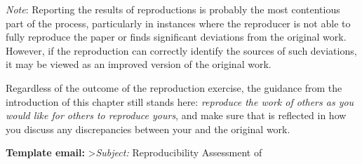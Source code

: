 \documentclass[]{book}
\begin{document}
\emph{Note}: Reporting the results of reproductions is probably the most contentious part of the process, particularly in instances where the reproducer is not able to fully reproduce the paper or finds significant deviations from the original work. However, if the reproduction can correctly identify the sources of such deviations, it may be viewed as an improved version of the original work.

Regardless of the outcome of the reproduction exercise, the guidance from the introduction of this chapter still stands here: \emph{reproduce the work of others as you would like for others to reproduce yours}, and make sure that is reflected in how you discuss any discrepancies between your and the original work.

\textbf{Template email:}
\textgreater{}\emph{Subject:} Reproducibility Assessment of
\end{document}
